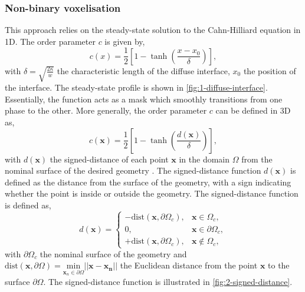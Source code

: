     \subsubsection{Non-binary voxelisation}
    This approach relies on the steady-state solution to the Cahn-Hilliard equation in 1D. The order parameter $c$ is given by,
    \begin{equation}
        c(x) = \frac{1}{2}\left[1 - \tanh\left(\frac{x-x_0}{\delta}\right)\right],
    \end{equation}
    with $\delta = \sqrt{\frac{2 \kappa}{w}}$ the characteristic length of the diffuse interface, $x_0$ the position of the interface. The steady-state profile is shown in \autoref{fig:1-diffuse-interface}.
    Essentially, the function acts as a mask which smoothly transitions from one phase to the other.
    More generally, the order parameter $c$ can be defined in 3D as,
    \begin{equation}
        c(\mathbf{x}) = \frac{1}{2}\left[ 1 - \tanh\left(\frac{d(\mathbf{x})}{\delta}\right)\right],
    \end{equation}
    with $d(\mathbf{x})$ the signed-distance of each point $\mathbf{x}$ in the domain $\Omega$ from the nominal surface of the desired geometry \cite{Katopodes2019}.
    The signed-distance function $d(\mathbf{x})$ is defined as the distance from the surface of the geometry, with a sign indicating whether the point is inside or outside the geometry. The signed-distance function is defined as,
    \begin{equation}
        d(\mathbf{x}) = \begin{cases}
            -\text{dist}(\mathbf{x}, \partial \Omega_c), & \mathbf{x} \in \Omega_c,\\
            0, & \mathbf{x} \in \partial \Omega_c,\\
            +\text{dist}(\mathbf{x}, \partial \Omega_c), &\mathbf{x} \notin \Omega_c,
        \end{cases}
    \end{equation}
    with $\partial \Omega_c$ the nominal surface of the geometry and $\text{dist}(\mathbf{x}, \partial \Omega)=\underset{\mathbf{x}_n \in \partial \Omega}{\text{min}}||\mathbf{x}-\mathbf{x_n}||$ the Euclidean distance from the point $\mathbf{x}$ to the surface $\partial \Omega$. The signed-distance function is illustrated in \autoref{fig:2-signed-distance}.
